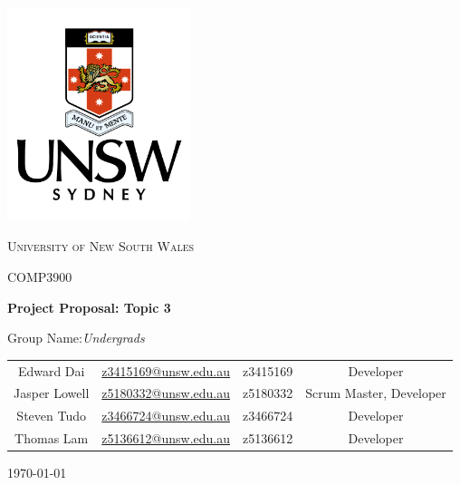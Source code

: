 \documentclass[12pt,a4paper]{article}
\begin{document}
\begin{titlepage}
  \centering
  \includegraphics[width=0.4\textwidth]{unsw.png}\par\vspace{1cm}
  {\scshape\LARGE University of New South Wales \par}
  \vspace{0.5cm}
  {\scshape\Large COMP3900 \par}
  \vspace{0.5cm}
  {\huge\bfseries Project Proposal: Topic 3 \par}
  \vspace{1cm}
  {\Large Group Name:\itshape Undergrads \par}
  \vspace{2cm}
  \begin{center}
    \begin{tabular}{c c c c}
      Edward Dai & \href{mailto:z3415169@unsw.edu.au}{z3415169@unsw.edu.au} &
      z3415169 & Developer \\
      Jasper Lowell & \href{mailto:z5180332@unsw.edu.au}{z5180332@unsw.edu.au} &
      z5180332 & Scrum Master, Developer \\
      Steven Tudo & \href{mailto:z3466724@unsw.edu.au}{z3466724@unsw.edu.au} &
      z3466724 & Developer \\
      Thomas Lam & \href{mailto:z5136612@unsw.edu.au}{z5136612@unsw.edu.au} &
      z5136612 & Developer
    \end{tabular}
  \end{center}
  \vfill
  {\large \today\par}
\end{titlepage}

\newpage
\setlength{\parindent}{0pt}
\setlength{\parskip}{\baselineskip}

\begin{abstract}
  An easy to use and intuitive web application that aims to connect clients and providers of accommodations in New South Wales, Australia based on preferences such as location, local utilities, ratings, and price.
\end{abstract}
\bigskip
\bigskip
\end{document}
